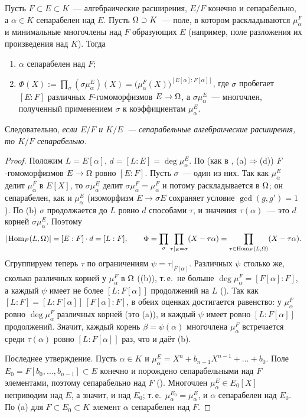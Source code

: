 \begin{proposition}
Пусть $F\subset E\subset K$~--- алгебраические расширения, $E/F$ конечно и сепарабельно, а $\alpha\in K$ сепарабелен над $E$.
Пусть $\Omega\supset K$~--- поле, в котором раскладываются $\mu^F_\alpha$ и минимальные многочлены над $F$ образующих $E$
(например, поле разложения их произведения над $K$). Тогда
\begin{enumerate}[label=\textup{(\alph*)}]
\item $\alpha$ сепарабелен над $F$;
\item $\displaystyle\Phi(X):=\prod_{\sigma}(\sigma\mu^E_\alpha)(X)=\bigl(\mu^F_\alpha(X)\bigr)^{[E[\alpha]:F[\alpha]]}$, где $\sigma$ пробегает
$[E:F]$ различных $F$-гомоморфизмов $E\to\Omega$, а $\sigma\mu^E_\alpha$~--- многочлен, полученный применением $\sigma$ к
коэффициентам $\mu^E_\alpha$.
\end{enumerate}
Следовательно, \emph{если $E/F$ и $K/E$~--- сепарабельные алгебраические расширения, то $K/F$ сепарабельно.}
\end{proposition}

\begin{proof}
Положим $L=E[\alpha]$, $d=[L:E]=\deg\mu^E_\alpha$. По  (как в , (a)$\Rightarrow$(d)) $F$-гомоморфизмов $E\to\Omega$ ровно
$[E:F]$. Пусть $\sigma$~--- один из них. Так как $\mu^E_\alpha$ делит $\mu^F_\alpha$ в $E[X]$, то $\sigma\mu^E_\alpha$ делит
$\sigma\mu^F_\alpha=\mu^F_\alpha$ и потому раскладывается в $\Omega$; он сепарабелен, как и $\mu^E_\alpha$ (изоморфизм
$E\to\sigma E$ сохраняет условие $\gcd(g,g')=1$). По (b) $\sigma$ продолжается до $L$ ровно $d$ способами $\tau$, и
значения $\tau(\alpha)$~--- это $d$ корней $\sigma\mu^E_\alpha$. Поэтому
\[
|\operatorname{Hom}_F(L,\Omega)|=[E:F]\cdot d=[L:F],\qquad \Phi=\prod_\sigma\prod_{\tau|_E=\sigma}(X-\tau\alpha)=\prod_{\tau\in\operatorname{Hom}_F(L,\Omega)}(X-\tau\alpha).
\]
Сгруппируем теперь $\tau$ по ограничениям $\psi=\tau|_{F[\alpha]}$. Различных $\psi$ столько же, сколько различных корней у
$\mu^F_\alpha$ в $\Omega$ ((b)), т.\,е.\ не больше $\deg\mu^F_\alpha=[F[\alpha]:F]$, а каждый $\psi$ имеет не более
$[L:F[\alpha]]$ продолжений на $L$ (). Так как $[L:F]=[L:F[\alpha]]\,[F[\alpha]:F]$, в обеих оценках достигается
равенство: у $\mu^F_\alpha$ ровно $\deg\mu^F_\alpha$ различных корней (это (a)), и каждый $\psi$ имеет ровно $[L:F[\alpha]]$
продолжений. Значит, каждый корень $\beta=\psi(\alpha)$ многочлена $\mu^F_\alpha$ встречается среди $\tau(\alpha)$ ровно
$[L:F[\alpha]]$ раз, что и даёт (b).

Последнее утверждение. Пусть $\alpha\in K$ и $\mu^E_\alpha=X^n+b_{n-1}X^{n-1}+\dots+b_0$. Поле $E_0=F[b_0,\dots,b_{n-1}]\subset E$
конечно и порождено сепарабельными над $F$ элементами, поэтому сепарабельно над $F$ (). Многочлен
$\mu^E_\alpha\in E_0[X]$ неприводим над $E$, а значит, и над $E_0$; т.\,е.\ $\mu^{E_0}_\alpha=\mu^E_\alpha$, и $\alpha$ сепарабелен над
$E_0$. По (a) для $F\subset E_0\subset K$ элемент $\alpha$ сепарабелен над $F$.
\end{proof}

